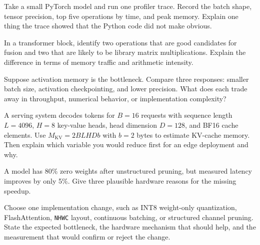 \begin{exercises}
\item Take a small PyTorch model and run one profiler trace. Record the batch shape, tensor precision, top five operations by time, and peak memory. Explain one thing the trace showed that the Python code did not make obvious.
\item In a transformer block, identify two operations that are good candidates for fusion and two that are likely to be library matrix multiplications. Explain the difference in terms of memory traffic and arithmetic intensity.
\item Suppose activation memory is the bottleneck. Compare three responses: smaller batch size, activation checkpointing, and lower precision. What does each trade away in throughput, numerical behavior, or implementation complexity?
\item A serving system decodes tokens for \(B=16\) requests with sequence length \(L=4096\), \(H=8\) key-value heads, head dimension \(D=128\), and BF16 cache elements. Use \(M_{\text{KV}} = 2BLHDb\) with \(b=2\) bytes to estimate KV-cache memory. Then explain which variable you would reduce first for an edge deployment and why.
\item A model has 80\% zero weights after unstructured pruning, but measured latency improves by only 5\%. Give three plausible hardware reasons for the missing speedup.
\item Choose one implementation change, such as INT8 weight-only quantization, FlashAttention, \texttt{NHWC} layout, continuous batching, or structured channel pruning. State the expected bottleneck, the hardware mechanism that should help, and the measurement that would confirm or reject the change.
\end{exercises}
